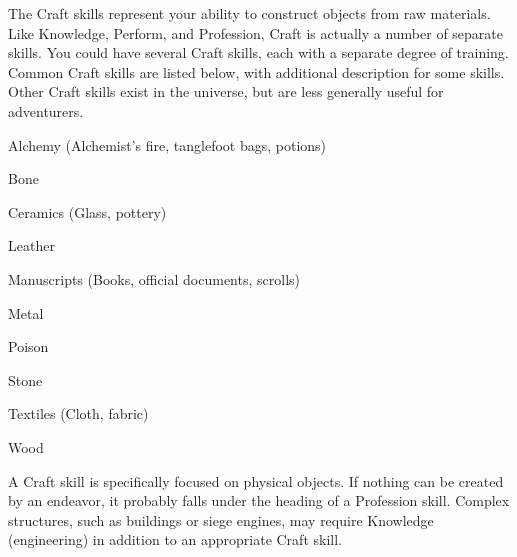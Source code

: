 \newpage
{}
  The Craft skills represent your ability to construct objects from raw materials.
  Like Knowledge, Perform, and Profession, Craft is actually a number of separate skills.
  You could have several Craft skills, each with a separate degree of training.
  Common Craft skills are listed below, with additional description for some skills.
  Other Craft skills exist in the universe, but are less generally useful for adventurers.

  \begin{raggeditemize}
    \item Alchemy (Alchemist's fire, tanglefoot bags, potions)
    \item Bone
    \item Ceramics (Glass, pottery)
    \item Leather
    \item Manuscripts (Books, official documents, scrolls)
    \item Metal
    \item Poison
    \item Stone
    \item Textiles (Cloth, fabric)
    \item Wood
  \end{raggeditemize}

  A Craft skill is specifically focused on physical objects. If nothing can be created by an endeavor, it probably falls under the heading of a Profession skill. Complex structures, such as buildings or siege engines, may require Knowledge (engineering) in addition to an appropriate Craft skill.

